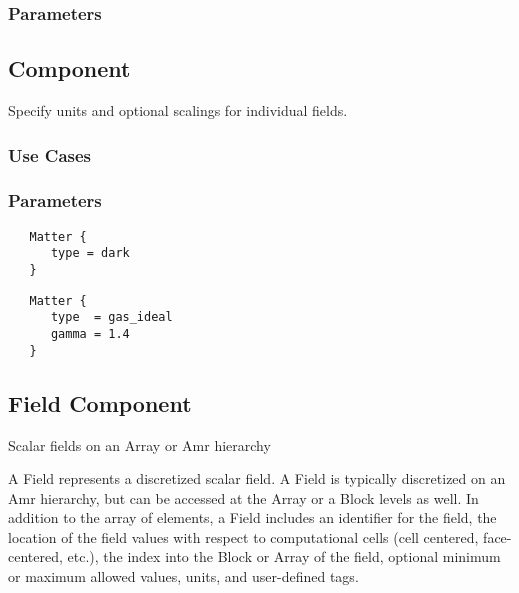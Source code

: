 \subsubsection{Parameters}

\subsection{ Component} \label{ss:component-matter}

 Specify units and optional scalings for individual
 fields.  

\subsubsection{Use Cases}

\subsubsection{Parameters}

\begin{verbatim}
   Matter {
      type = dark
   }
\end{verbatim}

\begin{verbatim}
   Matter {
      type  = gas_ideal
      gamma = 1.4
   }
\end{verbatim}


\subsection{ Field  Component}
Scalar fields on an Array or Amr hierarchy

A Field represents a discretized scalar field. A Field is typically
discretized on an Amr hierarchy, but can be accessed at the Array or a
Block levels as well. In addition to the array of elements, a Field
includes an identifier for the field, the location of the field values
with respect to computational cells (cell centered, face-centered,
etc.), the index into the Block or Array of the field, optional
minimum or maximum allowed values, units, and user-defined tags.

